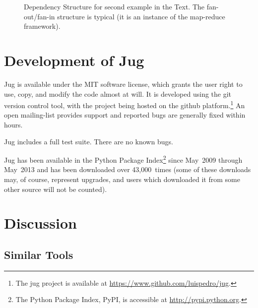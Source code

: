 \documentclass{article}
\begin{document}
\begin{figure}
\begin{center}

\end{center}
\caption{Dependency Structure for second example in the Text. The
fan-out/fan-in structure is typical (it is an instance of the map-reduce
framework).}
\label{fig:jug-deps-complex}
\end{figure}

\section{Development of Jug}
Jug is available under the MIT software license, which grants the user right to
use, copy, and modify the code almost at will. It is developed using the git
version control tool, with the project being hosted on the github
platform.\footnote{The jug project is available at
\url{https://www.github.com/luispedro/jug}.} An open mailing-list provides
support and reported bugs are generally fixed within hours.

Jug includes a full test suite. There are no known bugs.

Jug has been available in the Python Package Index\footnote{The Python Package
Index, PyPI, is accessible at \url{http://pypi.python.org}.} since May~2009
through May~2013 and has been downloaded over 43,000~times (some of these
downloads may, of course, represent upgrades, and users which downloaded it
from some other source will not be counted).

\section{Discussion}

\subsection{Similar Tools}
\end{document}
